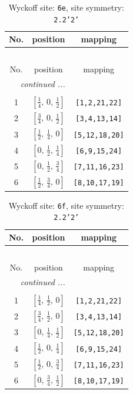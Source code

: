 \documentclass[fleqn,8pt]{jsarticle}
\begin{document}
\renewcommand{\arraystretch}{1.2}
\begin{longtable}{ccc}
\caption{Wyckoff site: {\tt 6e}, site symmetry: {\tt 2.2'2'}}
 \\
 \hline \hline
No. & position & mapping \\ \hline \endfirsthead

\multicolumn{2}{l}{\tablename\ \thetable{}} \\
 \hline \hline
No. & position & mapping \\ \hline \endhead

 \hline \hline
\multicolumn{2}{r}{\footnotesize\it continued ...} \\ \endfoot

 \hline \hline
\multicolumn{2}{r}{} \\ \endlastfoot

1 & $\left[ \frac{1}{4},\, 0,\, \frac{1}{2} \right]$ & {\tt [1,2,21,22]} \\ \hline
2 & $\left[ \frac{3}{4},\, 0,\, \frac{1}{2} \right]$ & {\tt [3,4,13,14]} \\ \hline
3 & $\left[ \frac{1}{2},\, \frac{1}{4},\, 0 \right]$ & {\tt [5,12,18,20]} \\ \hline
4 & $\left[ 0,\, \frac{1}{2},\, \frac{1}{4} \right]$ & {\tt [6,9,15,24]} \\ \hline
5 & $\left[ 0,\, \frac{1}{2},\, \frac{3}{4} \right]$ & {\tt [7,11,16,23]} \\ \hline
6 & $\left[ \frac{1}{2},\, \frac{3}{4},\, 0 \right]$ & {\tt [8,10,17,19]} \\
\end{longtable}
\renewcommand{\arraystretch}{1.2}
\begin{longtable}{ccc}
\caption{Wyckoff site: {\tt 6f}, site symmetry: {\tt 2.2'2'}}
 \\
 \hline \hline
No. & position & mapping \\ \hline \endfirsthead

\multicolumn{2}{l}{\tablename\ \thetable{}} \\
 \hline \hline
No. & position & mapping \\ \hline \endhead

 \hline \hline
\multicolumn{2}{r}{\footnotesize\it continued ...} \\ \endfoot

 \hline \hline
\multicolumn{2}{r}{} \\ \endlastfoot

1 & $\left[ \frac{1}{4},\, \frac{1}{2},\, 0 \right]$ & {\tt [1,2,21,22]} \\ \hline
2 & $\left[ \frac{3}{4},\, \frac{1}{2},\, 0 \right]$ & {\tt [3,4,13,14]} \\ \hline
3 & $\left[ 0,\, \frac{1}{4},\, \frac{1}{2} \right]$ & {\tt [5,12,18,20]} \\ \hline
4 & $\left[ \frac{1}{2},\, 0,\, \frac{1}{4} \right]$ & {\tt [6,9,15,24]} \\ \hline
5 & $\left[ \frac{1}{2},\, 0,\, \frac{3}{4} \right]$ & {\tt [7,11,16,23]} \\ \hline
6 & $\left[ 0,\, \frac{3}{4},\, \frac{1}{2} \right]$ & {\tt [8,10,17,19]} \\
\end{longtable}
\end{document}
